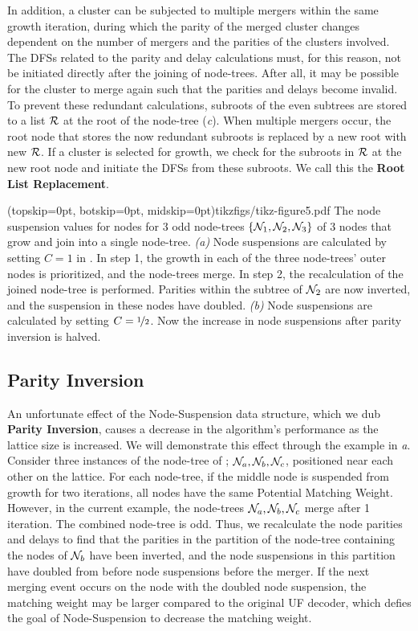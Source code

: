 In addition, a cluster can be subjected to multiple mergers within the same growth iteration, during which the parity of the merged cluster changes dependent on the number of mergers and the parities of the clusters involved. The DFSs related to the parity and delay calculations must, for this reason, not be initiated directly after the joining of node-trees. After all, it may be possible for the cluster to merge again such that the parities and delays become invalid. To prevent these redundant calculations, subroots of the even subtrees are stored to a list $\mathcal{R}$ at the root of the node-tree (\emph{c}). When multiple mergers occur, the root node that stores the now redundant subroots is replaced by a new root with new $\mathcal{R}$. If a cluster is selected for growth, we check for the subroots in $\mathcal{R}$ at the new root node and initiate the DFSs from these subroots. We call this the \textbf{Root List Replacement}. 

\Figure[htb](topskip=0pt, botskip=0pt, midskip=0pt){tikzfigs/tikz-figure5.pdf}{
    The node suspension values for nodes for 3 odd node-trees $\{\mathcal{N}_1, \mathcal{N}_2, \mathcal{N}_3\}$ of 3 nodes that grow and join into a single node-tree. \emph{(a)} Node suspensions are calculated by setting $C=1$ in . In step 1, the growth in each of the three node-trees' outer nodes is prioritized, and the node-trees merge. In step 2, the recalculation of the joined node-tree is performed. Parities within the subtree of $\mathcal{N}_2$ are now inverted, and the suspension in these nodes have doubled. \emph{(b)} Node suspensions are calculated by setting $C=\nicefrac{1}{2}$. Now the increase in node suspensions after parity inversion is halved.\label{fig5}}

\subsection{Parity Inversion}\label{sec:inversion}
An unfortunate effect of the Node-Suspension data structure, which we dub \textbf{Parity Inversion}, causes a decrease in the algorithm's performance as the lattice size is increased. We will demonstrate this effect through the example in \emph{a}. Consider three instances of the node-tree of ; $\mathcal{N}_a, \mathcal{N}_b, \mathcal{N}_c$, positioned near each other on the lattice. For each node-tree, if the middle node is suspended from growth for two iterations, all nodes have the same Potential Matching Weight. However, in the current example, the node-trees $\mathcal{N}_a, \mathcal{N}_b, \mathcal{N}_c$ merge after 1 iteration. The combined node-tree is odd. Thus, we recalculate the node parities and delays to find that the parities in the partition of the node-tree containing the nodes of $\mathcal{N}_b$ have been inverted, and the node suspensions in this partition have doubled from before node suspensions before the merger. If the next merging event occurs on the node with the doubled node suspension, the matching weight may be larger compared to the original UF decoder, which defies the goal of Node-Suspension to decrease the matching weight.

